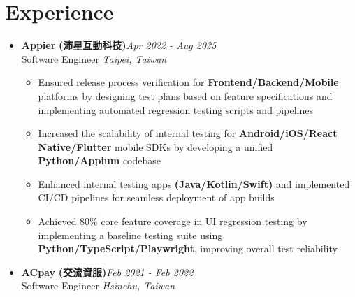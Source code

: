 \section{\sectionheading Experience}

\begin{itemize}[leftmargin=0pt, label={}]%

\item{
{\sectionheading\large{\textbf{Appier}}} \textbf{(沛星互動科技)}\hfill {\sectionheading\small{\textit{Apr 2022 - Aug 2025}}}\\
{\sectionheading\small{Software Engineer}}\hfill
{\sectionheading\small{\textit{Taipei, Taiwan}}}

    \vspace{-7pt}
    \begin{itemize}[label=\textbullet, leftmargin=*, noitemsep]
        \item{Ensured release process verification for \textbf{Frontend/Backend/Mobile} platforms by designing test plans based on feature specifications and implementing automated regression testing scripts and pipelines}
        \item{Increased the scalability of internal testing for \textbf{Android/iOS/React Native/Flutter} mobile SDKs by developing a unified \textbf{Python/Appium} codebase}
        \item{Enhanced internal testing apps \textbf{(Java/Kotlin/Swift)} and implemented CI/CD pipelines for seamless deployment of app builds}%
        \item{Achieved 80\% core feature coverage in UI regression testing by implementing a baseline testing suite using \textbf{Python/TypeScript/Playwright}, improving overall test reliability}
    \end{itemize}
}

\item{
{\sectionheading\large{\textbf{ACpay}}} \textbf{(交流資服)}\hfill {\sectionheading\small{\textit{Feb 2021 - Feb 2022}}}\\
{\sectionheading\small{Software Engineer}}\hfill
{\sectionheading\small{\textit{Hsinchu, Taiwan}}}

}
\end{itemize}
